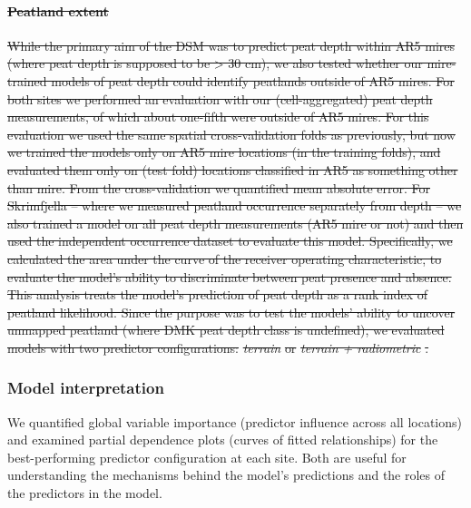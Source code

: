 \documentclass[soil, manuscript]{copernicus}
\providecommand{\DIFdel}[1]{{\protect\color{red}\sout{#1}}}                      %
\providecommand{\DIFdelbegin}{} %
\providecommand{\DIFdelend}{} %
\begin{document}
\DIFdelbegin \paragraph{\DIFdel{Peatland extent}}
\addtocounter{paragraph}{-1}%

\DIFdel{While the primary aim of the DSM was to predict peat depth within AR5 mires (where peat depth is supposed to be \textgreater{} 30 cm), we also tested whether our mire-trained models of peat depth could identify peatlands outside of AR5 mires.
For both sites we performed an evaluation with our (cell-aggregated) peat depth measurements, of which about one-fifth were outside of AR5 mires.
For this evaluation we used the same spatial cross-validation folds as previously, but now we trained the models only on AR5 mire locations (in the training folds), and evaluated them only on (test fold) locations classified in AR5 as something other than mire.
From the cross-validation we quantified mean absolute error.
For Skrimfjella -- where we measured peatland occurrence separately from depth -- we also trained a model on all peat depth measurements (AR5 mire or not) and then used the independent occurrence dataset to evaluate this model.
Specifically, we calculated the area under the curve of the receiver operating characteristic, to evaluate the model's ability to discriminate between peat presence and absence.
This analysis treats the model's prediction of peat depth as a rank index of peatland likelihood.
Since the purpose was to test the models' ability to uncover unmapped peatland (where DMK peat depth class is undefined), we evaluated models with two predictor configurations: }\emph{\DIFdel{terrain}} %
\DIFdel{or }\emph{\DIFdel{terrain + radiometric}}%
\DIFdel{.
}%

\DIFdelend \subsubsection{Model interpretation}

We quantified global variable importance (predictor influence across all locations) and examined partial dependence plots (curves of fitted relationships) for the best-performing predictor configuration at each site.
Both are useful for understanding the mechanisms behind the model's predictions and the roles of the predictors in the model.
\end{document}
